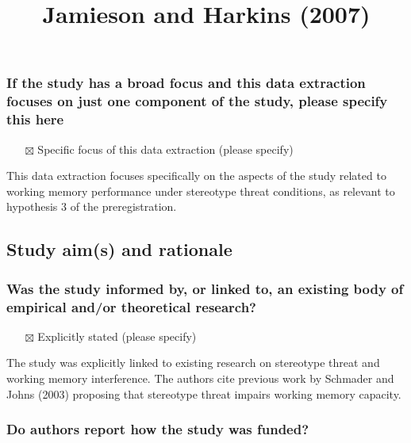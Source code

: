 \documentclass[
  doc, a4paper]{apa7}
\title{Jamieson and Harkins (2007)}
\author{\phantom{0}}
\date{}
\affiliation{\phantom{0}}
\providecommand{\tightlist}{%
  \setlength{\itemsep}{0pt}\setlength{\parskip}{0pt}}
\begin{document}
\maketitle

\subsubsection{If the study has a broad focus and this data extraction focuses on just one component of the study, please specify this here}\label{if-the-study-has-a-broad-focus-and-this-data-extraction-focuses-on-just-one-component-of-the-study-please-specify-this-here}

\begin{itemize}
\tightlist
\item[$\boxtimes$]
  Specific focus of this data extraction (please specify)
\end{itemize}

This data extraction focuses specifically on the aspects of the study related to working memory performance under stereotype threat conditions, as relevant to hypothesis 3 of the preregistration.

\subsection{Study aim(s) and rationale}\label{study-aims-and-rationale}

\subsubsection{Was the study informed by, or linked to, an existing body of empirical and/or theoretical research?}\label{was-the-study-informed-by-or-linked-to-an-existing-body-of-empirical-andor-theoretical-research}

\begin{itemize}
\tightlist
\item[$\boxtimes$]
  Explicitly stated (please specify)
\end{itemize}

The study was explicitly linked to existing research on stereotype threat and working memory interference. The authors cite previous work by Schmader and Johns (2003) proposing that stereotype threat impairs working memory capacity.

\subsubsection{Do authors report how the study was funded?}\label{do-authors-report-how-the-study-was-funded}
\end{document}
